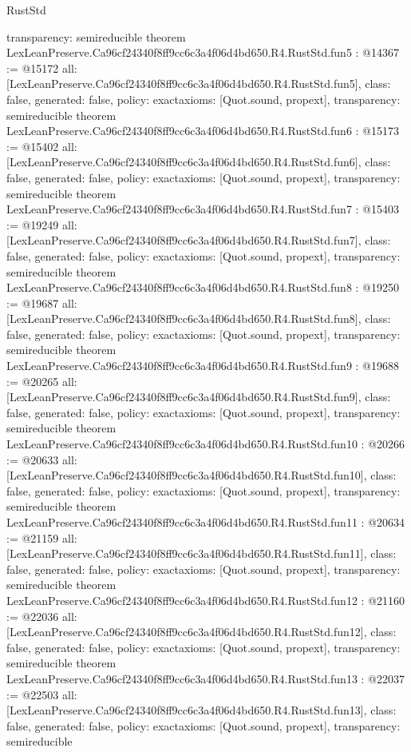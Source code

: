 \begin{lexlean}{RustStd}
\begin{coremodule}
{  transparency: semireducible
}
theorem LexLeanPreserve.Ca96cf24340f8ff9cc6c3a4f06d4bd650.R4.RustStd.fun5 : @14367 := @15172 {
  all: [LexLeanPreserve.Ca96cf24340f8ff9cc6c3a4f06d4bd650.R4.RustStd.fun5],
  class: false,
  generated: false,
  policy: exact{axioms: [Quot.sound, propext]},
  transparency: semireducible
}
theorem LexLeanPreserve.Ca96cf24340f8ff9cc6c3a4f06d4bd650.R4.RustStd.fun6 : @15173 := @15402 {
  all: [LexLeanPreserve.Ca96cf24340f8ff9cc6c3a4f06d4bd650.R4.RustStd.fun6],
  class: false,
  generated: false,
  policy: exact{axioms: [Quot.sound, propext]},
  transparency: semireducible
}
theorem LexLeanPreserve.Ca96cf24340f8ff9cc6c3a4f06d4bd650.R4.RustStd.fun7 : @15403 := @19249 {
  all: [LexLeanPreserve.Ca96cf24340f8ff9cc6c3a4f06d4bd650.R4.RustStd.fun7],
  class: false,
  generated: false,
  policy: exact{axioms: [Quot.sound, propext]},
  transparency: semireducible
}
theorem LexLeanPreserve.Ca96cf24340f8ff9cc6c3a4f06d4bd650.R4.RustStd.fun8 : @19250 := @19687 {
  all: [LexLeanPreserve.Ca96cf24340f8ff9cc6c3a4f06d4bd650.R4.RustStd.fun8],
  class: false,
  generated: false,
  policy: exact{axioms: [Quot.sound, propext]},
  transparency: semireducible
}
theorem LexLeanPreserve.Ca96cf24340f8ff9cc6c3a4f06d4bd650.R4.RustStd.fun9 : @19688 := @20265 {
  all: [LexLeanPreserve.Ca96cf24340f8ff9cc6c3a4f06d4bd650.R4.RustStd.fun9],
  class: false,
  generated: false,
  policy: exact{axioms: [Quot.sound, propext]},
  transparency: semireducible
}
theorem LexLeanPreserve.Ca96cf24340f8ff9cc6c3a4f06d4bd650.R4.RustStd.fun10 : @20266 := @20633 {
  all: [LexLeanPreserve.Ca96cf24340f8ff9cc6c3a4f06d4bd650.R4.RustStd.fun10],
  class: false,
  generated: false,
  policy: exact{axioms: [Quot.sound, propext]},
  transparency: semireducible
}
theorem LexLeanPreserve.Ca96cf24340f8ff9cc6c3a4f06d4bd650.R4.RustStd.fun11 : @20634 := @21159 {
  all: [LexLeanPreserve.Ca96cf24340f8ff9cc6c3a4f06d4bd650.R4.RustStd.fun11],
  class: false,
  generated: false,
  policy: exact{axioms: [Quot.sound, propext]},
  transparency: semireducible
}
theorem LexLeanPreserve.Ca96cf24340f8ff9cc6c3a4f06d4bd650.R4.RustStd.fun12 : @21160 := @22036 {
  all: [LexLeanPreserve.Ca96cf24340f8ff9cc6c3a4f06d4bd650.R4.RustStd.fun12],
  class: false,
  generated: false,
  policy: exact{axioms: [Quot.sound, propext]},
  transparency: semireducible
}
theorem LexLeanPreserve.Ca96cf24340f8ff9cc6c3a4f06d4bd650.R4.RustStd.fun13 : @22037 := @22503 {
  all: [LexLeanPreserve.Ca96cf24340f8ff9cc6c3a4f06d4bd650.R4.RustStd.fun13],
  class: false,
  generated: false,
  policy: exact{axioms: [Quot.sound, propext]},
  transparency: semireducible
}
\end{coremodule}
\end{lexlean}

